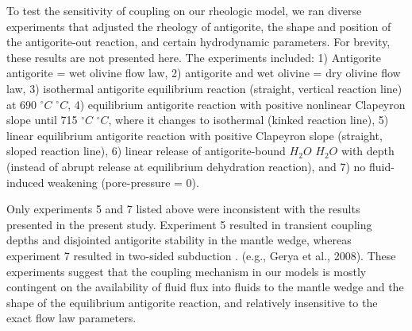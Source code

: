 \documentclass[draft,linenumbers]{agujournal2018} %
\providecommand{\DIFaddtex}[1]{{\protect\color{blue} \sf #1}} %
\providecommand{\DIFdeltex}[1]{{\protect\color{red} \scriptsize #1}} %
\providecommand{\DIFaddbegin}{} %
\providecommand{\DIFaddend}{} %
\providecommand{\DIFdelbegin}{} %
\providecommand{\DIFdelend}{} %
\providecommand{\DIFadd}[1]{\texorpdfstring{\DIFaddtex{#1}}{#1}} %
\providecommand{\DIFdel}[1]{\texorpdfstring{\DIFdeltex{#1}}{}} %
\newcommand{\DIFscaledelfig}{0.3}
\newlength{\DIFdelgraphicswidth} %
\newlength{\DIFdelgraphicsheight} %
\newcommand{\DIFaddincludegraphics}[2][]{{\color{blue}\fbox{\DIFOincludegraphics[#1]{#2}}}} %
\newcommand{\DIFdelincludegraphics}[2][]{%
\sbox{\DIFdelgraphicsbox}{\DIFOincludegraphics[#1]{#2}}%
\settoboxwidth{\DIFdelgraphicswidth}{\DIFdelgraphicsbox} %
\settoboxtotalheight{\DIFdelgraphicsheight}{\DIFdelgraphicsbox} %
\scalebox{\DIFscaledelfig}{%
\parbox[b]{\DIFdelgraphicswidth}{\usebox{\DIFdelgraphicsbox}\\[-\baselineskip] \rule{\DIFdelgraphicswidth}{0em}}\llap{\resizebox{\DIFdelgraphicswidth}{\DIFdelgraphicsheight}{%
\setlength{\unitlength}{\DIFdelgraphicswidth}%
\begin{picture}(1,1)%
\thicklines\linethickness{2pt} %
{\color[rgb]{1,0,0}\put(0,0){\framebox(1,1){}}}%
{\color[rgb]{1,0,0}\put(0,0){\line( 1,1){1}}}%
{\color[rgb]{1,0,0}\put(0,1){\line(1,-1){1}}}%
\end{picture}%
}\hspace*{3pt}}} %
} %
\DeclareRobustCommand{\DIFaddbegin}{\DIFOaddbegin \let\includegraphics\DIFaddincludegraphics} %
\DeclareRobustCommand{\DIFaddend}{\DIFOaddend \let\includegraphics\DIFOincludegraphics} %
\DeclareRobustCommand{\DIFdelbegin}{\DIFOdelbegin \let\includegraphics\DIFdelincludegraphics} %
\DeclareRobustCommand{\DIFdelend}{\DIFOaddend \let\includegraphics\DIFOincludegraphics} %
\begin{document}
To test the sensitivity of coupling on our rheologic model, we ran
diverse experiments that adjusted the rheology of antigorite, the shape
and position of the antigorite-out reaction, and certain hydrodynamic
parameters. For brevity, these results are not presented here. The
experiments included: 1) \DIFdelbegin \DIFdel{Antigorite }\DIFdelend \DIFaddbegin \DIFadd{antigorite }\DIFaddend = wet olivine flow law, 2)
antigorite and wet olivine = dry olivine flow law, 3) isothermal
antigorite \DIFdelbegin \DIFdel{equilibrium }\DIFdelend reaction (straight, vertical reaction line) at 690
\DIFdelbegin \DIFdel{$^{\circ}C$}\DIFdelend \DIFaddbegin \DIFadd{\(^{\circ}C\)}\DIFaddend , 4) \DIFdelbegin \DIFdel{equilibrium }\DIFdelend antigorite reaction with positive nonlinear Clapeyron
slope until 715 \DIFdelbegin \DIFdel{$^{\circ}C$}\DIFdelend \DIFaddbegin \DIFadd{\(^{\circ}C\)}\DIFaddend , where it changes to isothermal (kinked
reaction line), 5) linear \DIFdelbegin \DIFdel{equilibrium }\DIFdelend antigorite reaction with positive Clapeyron
slope (straight, sloped reaction line), 6) linear release of
antigorite-bound \DIFdelbegin \DIFdel{$H_2O$ }\DIFdelend \DIFaddbegin \DIFadd{\(H_{2}O\) }\DIFaddend with depth (instead of abrupt release at
equilibrium dehydration reaction), and 7) no fluid-induced weakening
(pore-pressure = 0).

Only experiments 5 and 7 listed above were inconsistent with the results
presented in the present study. Experiment 5 resulted in transient
coupling depths and disjointed antigorite stability in the mantle wedge,
whereas experiment 7 resulted in two-sided subduction \DIFdelbegin %
\DIFdel{.}\DIFdelend \DIFaddbegin \DIFadd{(e.g., Gerya et
al., 2008). }\DIFaddend These experiments suggest that the coupling mechanism in our
models is mostly contingent on the availability of \DIFdelbegin \DIFdel{fluid flux into }\DIFdelend \DIFaddbegin \DIFadd{fluids to }\DIFaddend the mantle
wedge and the shape of the equilibrium antigorite reaction, and
relatively insensitive to the exact flow law parameters.
\end{document}
